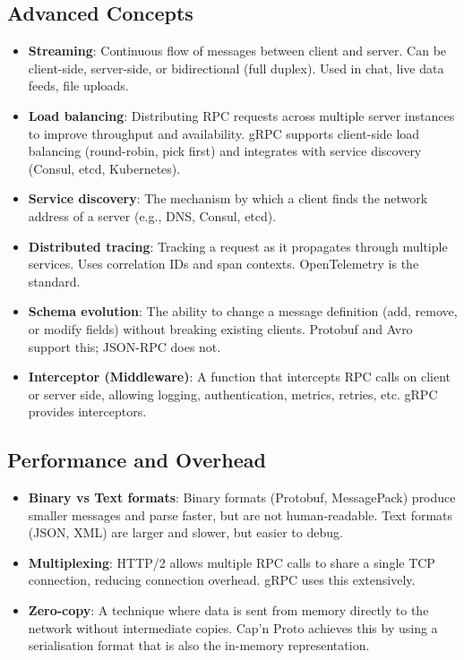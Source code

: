 \documentclass[10pt,a4paper]{article}
\begin{document}
\subsection*{Advanced Concepts}
\begin{itemize}
    \item \textbf{Streaming}: Continuous flow of messages between client and server. Can be client-side, server-side, or bidirectional (full duplex). Used in chat, live data feeds, file uploads.
    \item \textbf{Load balancing}: Distributing RPC requests across multiple server instances to improve throughput and availability. gRPC supports client-side load balancing (round-robin, pick first) and integrates with service discovery (Consul, etcd, Kubernetes).
    \item \textbf{Service discovery}: The mechanism by which a client finds the network address of a server (e.g., DNS, Consul, etcd).
    \item \textbf{Distributed tracing}: Tracking a request as it propagates through multiple services. Uses correlation IDs and span contexts. OpenTelemetry is the standard.
    \item \textbf{Schema evolution}: The ability to change a message definition (add, remove, or modify fields) without breaking existing clients. Protobuf and Avro support this; JSON-RPC does not.
    \item \textbf{Interceptor (Middleware)}: A function that intercepts RPC calls on client or server side, allowing logging, authentication, metrics, retries, etc. gRPC provides interceptors.
\end{itemize}

\subsection*{Performance and Overhead}
\begin{itemize}
    \item \textbf{Binary vs Text formats}: Binary formats (Protobuf, MessagePack) produce smaller messages and parse faster, but are not human-readable. Text formats (JSON, XML) are larger and slower, but easier to debug.
    \item \textbf{Multiplexing}: HTTP/2 allows multiple RPC calls to share a single TCP connection, reducing connection overhead. gRPC uses this extensively.
    \item \textbf{Zero-copy}: A technique where data is sent from memory directly to the network without intermediate copies. Cap’n Proto achieves this by using a serialisation format that is also the in-memory representation.
\end{itemize}
\end{document}
